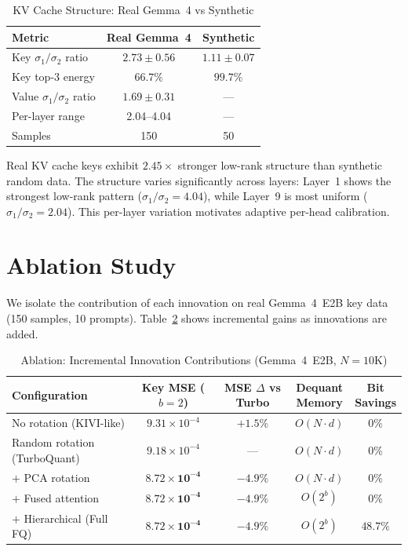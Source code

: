 \documentclass[10pt,twocolumn]{article}
\begin{document}
\begin{table}[t]
\centering
\caption{KV Cache Structure: Real Gemma~4 vs Synthetic}
\label{tab:structure}
\begin{tabular}{lcc}
\toprule
Metric & Real Gemma~4 & Synthetic \\
\midrule
Key $\sigma_1/\sigma_2$ ratio & $2.73 \pm 0.56$ & $1.11 \pm 0.07$ \\
Key top-3 energy & $66.7\%$ & $99.7\%$ \\
Value $\sigma_1/\sigma_2$ ratio & $1.69 \pm 0.31$ & --- \\
\midrule
Per-layer range & 2.04--4.04 & --- \\
Samples & 150 & 50 \\
\bottomrule
\end{tabular}
\end{table}

Real KV cache keys exhibit $2.45\times$ stronger low-rank structure than synthetic random data. The structure varies significantly across layers: Layer~1 shows the strongest low-rank pattern ($\sigma_1/\sigma_2 = 4.04$), while Layer~9 is most uniform ($\sigma_1/\sigma_2 = 2.04$). This per-layer variation motivates adaptive per-head calibration.

\section{Ablation Study}

We isolate the contribution of each innovation on real Gemma~4~E2B key data (150 samples, 10 prompts). Table~\ref{tab:ablation} shows incremental gains as innovations are added.

\begin{table}[t]
\centering
\caption{Ablation: Incremental Innovation Contributions (Gemma~4~E2B, $N{=}10$K)}
\label{tab:ablation}
\begin{tabular}{lcccc}
\toprule
Configuration & \makecell{Key MSE\\($b{=}2$)} & \makecell{MSE $\Delta$\\vs Turbo} & \makecell{Dequant\\Memory} & \makecell{Bit\\Savings} \\
\midrule
No rotation (KIVI-like) & $9.31 \times 10^{-4}$ & $+1.5\%$ & $O(N \!\cdot\! d)$ & 0\% \\
Random rotation (TurboQuant) & $9.18 \times 10^{-4}$ & --- & $O(N \!\cdot\! d)$ & 0\% \\
\midrule
$+$ PCA rotation & $\mathbf{8.72 \times 10^{-4}}$ & $-4.9\%$ & $O(N \!\cdot\! d)$ & 0\% \\
$+$ Fused attention & $\mathbf{8.72 \times 10^{-4}}$ & $-4.9\%$ & $O(2^b)$ & 0\% \\
$+$ Hierarchical (Full FQ) & $\mathbf{8.72 \times 10^{-4}}$ & $-4.9\%$ & $O(2^b)$ & $48.7\%$ \\
\bottomrule
\end{tabular}
\end{table}
\end{document}
